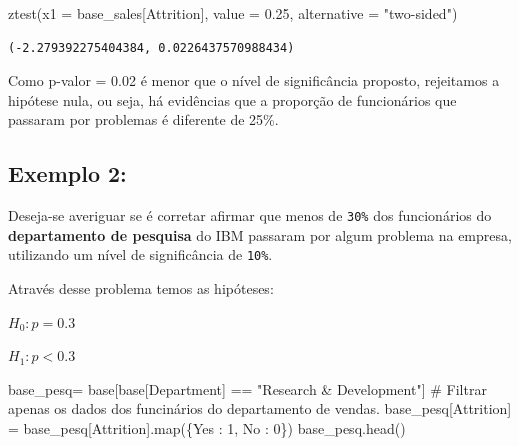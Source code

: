 \documentclass[
  letterpaper,
  DIV=11,
  numbers=noendperiod]{scrreprt}
\newenvironment{Shaded}{\begin{snugshade}}{\end{snugshade}}
\newcommand{\BuiltInTok}[1]{\textcolor[rgb]{0.00,0.23,0.31}{#1}}
\newcommand{\CommentTok}[1]{\textcolor[rgb]{0.37,0.37,0.37}{#1}}
\newcommand{\DecValTok}[1]{\textcolor[rgb]{0.68,0.00,0.00}{#1}}
\newcommand{\FloatTok}[1]{\textcolor[rgb]{0.68,0.00,0.00}{#1}}
\newcommand{\NormalTok}[1]{\textcolor[rgb]{0.00,0.23,0.31}{#1}}
\newcommand{\OperatorTok}[1]{\textcolor[rgb]{0.37,0.37,0.37}{#1}}
\newcommand{\StringTok}[1]{\textcolor[rgb]{0.13,0.47,0.30}{#1}}
\begin{document}
\begin{Shaded}
\begin{Highlighting}[]
\NormalTok{ztest(x1 }\OperatorTok{=}\NormalTok{ base\_sales[}\StringTok{\textquotesingle{}Attrition\textquotesingle{}}\NormalTok{], value }\OperatorTok{=} \FloatTok{0.25}\NormalTok{, alternative }\OperatorTok{=} \StringTok{"two{-}sided"}\NormalTok{)}
\end{Highlighting}
\end{Shaded}

\begin{tcolorbox}[enhanced jigsaw, breakable, leftrule=.75mm, left=2mm, opacityback=0, bottomrule=.15mm, toprule=.15mm, rightrule=.15mm, arc=.35mm, colback=white]

\begin{verbatim}
(-2.279392275404384, 0.0226437570988434)
\end{verbatim}

\end{tcolorbox}

Como p-valor = 0.02 é menor que o nível de significância proposto,
rejeitamos a hipótese nula, ou seja, há evidências que a proporção de
funcionários que passaram por problemas é diferente de 25\%.

\hypertarget{exemplo-2-1}{%
\subsection{Exemplo 2:}\label{exemplo-2-1}}

Deseja-se averiguar se é corretar afirmar que menos de \texttt{30\%} dos
funcionários do \textbf{departamento de pesquisa} do IBM passaram por
algum problema na empresa, utilizando um nível de significância de
\texttt{10\%}.

Através desse problema temos as hipóteses:

\(H_{0} : p = 0.3\)

\(H_{1} : p< 0.3\)

\begin{Shaded}
\begin{Highlighting}[]
\NormalTok{base\_pesq}\OperatorTok{=}\NormalTok{ base[base[}\StringTok{\textquotesingle{}Department\textquotesingle{}}\NormalTok{] }\OperatorTok{==} \StringTok{"Research \& Development"}\NormalTok{] }\CommentTok{\# Filtrar apenas os dados dos funcinários do departamento de vendas.}
\NormalTok{base\_pesq[}\StringTok{\textquotesingle{}Attrition\textquotesingle{}}\NormalTok{] }\OperatorTok{=}\NormalTok{ base\_pesq[}\StringTok{\textquotesingle{}Attrition\textquotesingle{}}\NormalTok{].}\BuiltInTok{map}\NormalTok{(\{}\StringTok{\textquotesingle{}Yes\textquotesingle{}}\NormalTok{ : }\DecValTok{1}\NormalTok{, }\StringTok{\textquotesingle{}No\textquotesingle{}}\NormalTok{ : }\DecValTok{0}\NormalTok{\})}
\NormalTok{base\_pesq.head()}
\end{Highlighting}
\end{Shaded}
\end{document}
